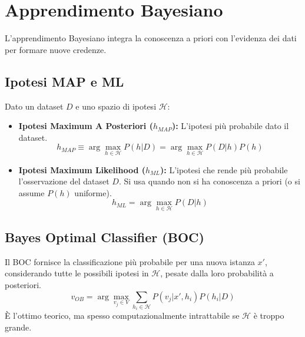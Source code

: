 \documentclass[a4paper,11pt]{article}
\begin{document}
\section{Apprendimento Bayesiano}

L'apprendimento Bayesiano integra la conoscenza a priori con l'evidenza dei dati per formare nuove credenze.

\subsection{Ipotesi MAP e ML}
Dato un dataset $D$ e uno spazio di ipotesi $\mathcal{H}$:
\begin{itemize}
    \item \textbf{Ipotesi Maximum A Posteriori ($h_{MAP}$):} L'ipotesi più probabile dato il dataset.
    \begin{equation}
        h_{MAP} \equiv \arg\max_{h \in \mathcal{H}} P(h|D) = \arg\max_{h \in \mathcal{H}} P(D|h)P(h)
    \end{equation}
    \item \textbf{Ipotesi Maximum Likelihood ($h_{ML}$):} L'ipotesi che rende più probabile l'osservazione del dataset $D$. Si usa quando non si ha conoscenza a priori (o si assume $P(h)$ uniforme).
    \begin{equation}
        h_{ML} = \arg\max_{h \in \mathcal{H}} P(D|h)
    \end{equation}
\end{itemize}

\subsection{Bayes Optimal Classifier (BOC)}
Il BOC fornisce la classificazione più probabile per una nuova istanza $x'$, considerando tutte le possibili ipotesi in $\mathcal{H}$, pesate dalla loro probabilità a posteriori.
\begin{equation}
    v_{OB} = \arg\max_{v_j \in V} \sum_{h_i \in \mathcal{H}} P(v_j | x', h_i) P(h_i | D)
\end{equation}
È l'ottimo teorico, ma spesso computazionalmente intrattabile se $\mathcal{H}$ è troppo grande.
\end{document}
